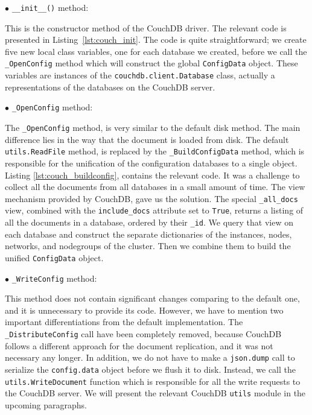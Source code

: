 \begin{description}
    \bigskip
    $\bullet$ {\Large{\texttt{\_\_init\_\_()} method:}}

    This is the constructor method of the CouchDB driver. The relevant code is
    presented in Listing~\ref{lst:couch_init}. The code is quite
    straightforward; we create five new local class variables, one for each
    database we created, before we call the \texttt{\_OpenConfig} method
    which will construct the global \texttt{ConfigData} object. These
    variables are instances of the \texttt{couchdb.client.Database} class,
    actually a representations of the databases on the CouchDB server.

    \newpage

    \smallskip
    $\bullet$ {\Large{\texttt{\_OpenConfig} method:}}

    The \texttt{\_OpenConfig} method, is very similar to the default disk
    method. The main difference lies in the way that the document is loaded from
    disk. The default \texttt{utils.ReadFile} method, is replaced by the
    \texttt{\_BuildConfigData} method, which is responsible for the unification
    of the configuration databases to a single object. Listing
    \ref{lst:couch_buildconfig}, contains the relevant code.
    It was a challenge to collect all the documents from all databases in a
    small amount of time. The view mechanism provided by CouchDB, gave us the
    solution. The special \texttt{\_all\_docs} view, combined with the
    \texttt{include\_docs} attribute set to \texttt{True}, returns a listing of
    all the documents in a database, ordered by their \texttt{\_id}. We query
    that view on each database and construct the separate dictionaries of the
    instances, nodes, networks, and nodegroups of the cluster. Then we combine
    them to build the unified \texttt{ConfigData} object.


    \bigskip
    $\bullet$ {\Large{\texttt{\_WriteConfig} method:}}

    This method does not contain significant changes comparing to the default
    one, and it is unnecessary to provide its code. However, we have to mention
    two important differentiations from the default implementation. The
    \texttt{\_DistributeConfig} call have been completely removed, because
    CouchDB follows a different approach for the document replication, and it
    was not necessary any longer. In addition, we do not have to make a
    \texttt{json.dump} call to serialize the \texttt{config.data} object before
    we flush it to disk. Instead, we call the \texttt{utils.WriteDocument}
    function which is responsible for all the write requests to the CouchDB
    server. We will present the relevant CouchDB \texttt{utils} module in the
    upcoming paragraphs.\\


\end{description}
